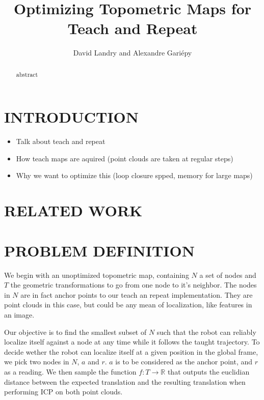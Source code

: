 \documentclass[letterpaper,10 pt,conference]{ieeeconf}
\title{\LARGE \bf
  Optimizing Topometric Maps for Teach and Repeat
}
\author{David Landry and Alexandre Gari\'epy}
\begin{document}
\maketitle
\thispagestyle{empty}
\pagestyle{empty}


\begin{abstract}

  abstract

\end{abstract}

\section{INTRODUCTION}



\begin{itemize}
    \item Talk about teach and repeat
    \item How teach maps are aquired (point clouds are taken at regular steps)
    \item Why we want to optimize this (loop closure spped, memory for large maps)
\end{itemize}


\section{RELATED WORK}


\section{PROBLEM DEFINITION}

We begin with an unoptimized topometric map, containing $N$ a set of nodes and $T$ the geometric transformations to go
from one node to it's neighbor. The nodes in $N$ are in fact anchor points to our teach an repeat
implementation. They are point clouds in this case, but could be any mean of localization, like
features in an image.

Our objective is to find the smallest subset of $N$ such that the robot
can reliably localize itself against a node at any time while it follows the taught trajectory. To
decide wether the robot can localize itself at a given position in the global frame, we pick two
nodes in $N$, $a$ and $r$. $a$ is to be considered as the anchor point, and $r$ as a reading. We
then sample the function $f: T \rightarrow \mathbb{R}$ that outputs the euclidian distance between
the expected translation and the resulting translation when performing ICP on both point clouds.
\end{document}
